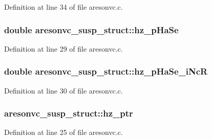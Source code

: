 Definition at line 34 of file aresonvc.\+c.

\subsubsection[{\texorpdfstring{hz\+\_\+p\+Ha\+Se}{hz_pHaSe}}]{\setlength{\rightskip}{0pt plus 5cm}double aresonvc\+\_\+susp\+\_\+struct\+::hz\+\_\+p\+Ha\+Se}\hypertarget{structaresonvc__susp__struct_a4821ea5e40628b130fb854b95ae601df}{}\label{structaresonvc__susp__struct_a4821ea5e40628b130fb854b95ae601df}


Definition at line 29 of file aresonvc.\+c.

\subsubsection[{\texorpdfstring{hz\+\_\+p\+Ha\+Se\+\_\+i\+NcR}{hz_pHaSe_iNcR}}]{\setlength{\rightskip}{0pt plus 5cm}double aresonvc\+\_\+susp\+\_\+struct\+::hz\+\_\+p\+Ha\+Se\+\_\+i\+NcR}\hypertarget{structaresonvc__susp__struct_adc08ab4d1e0f3cfbb4d0549a1397e198}{}\label{structaresonvc__susp__struct_adc08ab4d1e0f3cfbb4d0549a1397e198}


Definition at line 30 of file aresonvc.\+c.

\subsubsection[{\texorpdfstring{hz\+\_\+ptr}{hz_ptr}}]{ aresonvc\+\_\+susp\+\_\+struct\+::hz\+\_\+ptr}\hypertarget{structaresonvc__susp__struct_a1d82efd8065f61bd54a0326d2c5e9417}{}\label{structaresonvc__susp__struct_a1d82efd8065f61bd54a0326d2c5e9417}


Definition at line 25 of file aresonvc.\+c.

